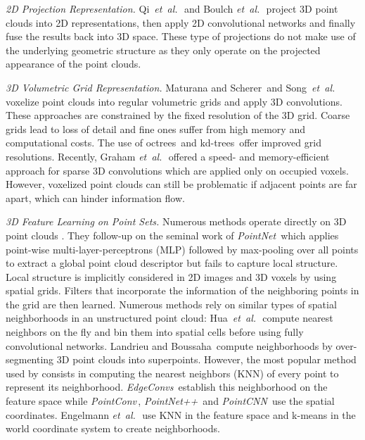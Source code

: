 \documentclass[letterpaper, 10 pt, conference]{ieeeconf}
\def\etal{\emph{et~al.}\,}
\newcommand{\parag}[1]{\vspace{0ex} \textit{#1}}
\begin{document}
\parag{2D Projection Representation.}
Qi~\etal \,\cite{Qi16CVPR} and Boulch \etal\,\cite{Boulch17CG} project 3D point clouds into 2D representations, then apply 2D convolutional networks and finally fuse the results back into 3D space.
These type of projections do not make use of the underlying geometric structure as they only operate on the projected appearance of the point clouds.

\parag{3D Volumetric Grid Representation.}
Maturana and Scherer\,\cite{Maturana15IROS} and Song~\etal\cite{Song15CVPR} voxelize point clouds into regular volumetric grids and apply 3D convolutions.
These approaches are constrained by the fixed resolution of the 3D grid.
Coarse grids lead to loss of detail and fine ones suffer from high memory and computational costs.
The use of octrees\,\cite{Riegler18CVPR} and kd-trees\,\cite{Klokov17ICCV} offer improved grid resolutions.
Recently, Graham \etal\,\cite{Graham18CVPR} offered a speed- and memory-efficient approach for sparse 3D convolutions which are applied only on occupied voxels.
However, voxelized point clouds can still be problematic if adjacent points are far apart, which can hinder information flow. 

\parag{3D Feature Learning on Point Sets.}
Numerous methods operate directly on 3D point clouds \cite{Qi17CVPR, Wang18CVPRa, Wang18CoRR, Wu18CVPR}.
They follow-up on the seminal work of \emph{PointNet}\,\cite{Qi17CVPR} which applies point-wise multi-layer-perceptrons (MLP) followed by max-pooling over all points to extract a global point cloud descriptor but fails to capture local structure.
Local structure is implicitly considered in 2D images and 3D voxels by using spatial grids.
Filters that incorporate the information of the neighboring points in the grid are then learned.
Numerous methods rely on similar types of spatial neighborhoods in an unstructured point cloud:
Hua~\etal\,\cite{Hua18CVPR} compute nearest neighbors on the fly and bin them into spatial cells before using fully convolutional networks.
Landrieu and Boussaha\,\cite{Landrieu19CVPR} compute neighborhoods by over-segmenting 3D point clouds into superpoints.
However, the most popular method used by \cite{Engelmann18ECCVW, Li18NIPS, Qi17NIPS, Wang18CoRR, Wu18CVPR} consists in computing the  nearest neighbors (KNN) of every point to represent its neighborhood.
\emph{EdgeConvs}\,\cite{Wang18CoRR} establish this neighborhood on the feature space while \emph{PointConv}\,\cite{Wu18CVPR}, \emph{PointNet++}\,\cite{Qi17NIPS} and  \emph{PointCNN}\,\cite{Li18NIPS} use the spatial coordinates.
Engelmann \etal\,\cite{Engelmann18ECCVW} use KNN in the feature space and k-means in the world coordinate system to create neighborhoods.
\end{document}

